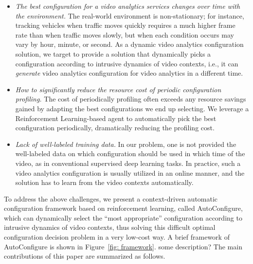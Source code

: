 \begin{itemize}	
\item \emph{The best configuration for a video analytics services changes over time with the environment.} The real-world environment is non-stationary; for instance, tracking vehicles when traffic moves quickly requires a much higher frame rate than when traffic moves slowly, but when each condition occurs may vary by hour, minute, or second. As a dynamic video analytics configuration solution, we target to provide a solution that dynamically picks a configuration according to intrusive dynamics of video contexts, i.e., it can \emph{generate} video analytics configuration for video analytics in a different time.

\item \emph{How to significantly reduce the resource cost of periodic configuration profiling.} The cost of periodically profiling often exceeds any resource savings gained by adapting the best configurations we end up selecting. We leverage a Reinforcement Learning-based agent to automatically pick the best configuration periodically, dramatically reducing the profiling cost. 

\item \emph{Lack of well-labeled training data.} In our problem, one is not provided the well-labeled data on which configuration should be used in which time of the video, as in conventional supervised deep learning tasks. In practice, such a video analytics configuration is usually utilized in an online manner, and the solution has to learn from the video contexts automatically. 
\end{itemize}

To address the above challenges, we present a context-driven automatic configuration framework based on reinforcement learning, called AutoConfigure, which can dynamically select the ``most appropriate'' configuration according to intrusive dynamics of video contexts, thus solving this difficult optimal configuration decision problem in a very low-cost way. A brief framework of AutoConfigure is shown in Figure~\ref{fig: framework}. \textcolor{note}{some description?} The main contributions of this paper are summarized as follows.


